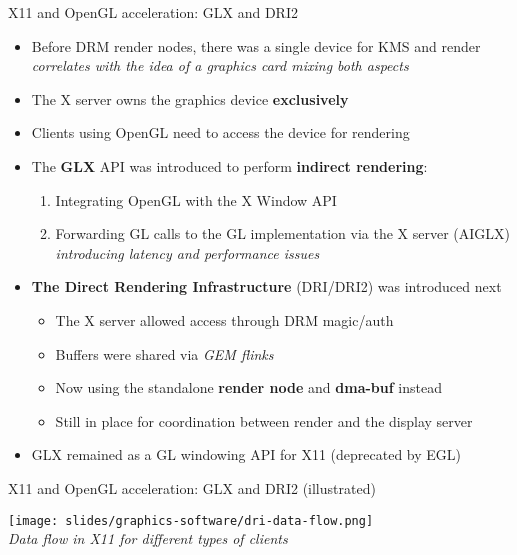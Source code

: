 \begin{frame}{X11 and OpenGL acceleration: GLX and DRI2}
  \begin{itemize}
  \item Before DRM render nodes, there was a single device for KMS and render\\
    \textit{correlates with the idea of a graphics card mixing both aspects}
  \item The X server owns the graphics device \textbf{exclusively}
  \item Clients using OpenGL need to access the device for rendering
  \item The \textbf{GLX} API was introduced to perform \textbf{indirect rendering}:
    \begin{enumerate}
    \item Integrating OpenGL with the X Window API
    \item Forwarding GL calls to the GL implementation via the X server (AIGLX)\\
      \textit{introducing latency and performance issues}
    \end{enumerate}
  \item \textbf{The Direct Rendering Infrastructure} (DRI/DRI2) was introduced next
    \begin{itemize}
    \item The X server allowed access through DRM magic/auth
    \item Buffers were shared via \textit{GEM flinks}
    \item Now using the standalone \textbf{render node} and \textbf{dma-buf} instead
    \item Still in place for coordination between render and the display server
    \end{itemize}
  \item GLX remained as a GL windowing API for X11 (deprecated by EGL)
  \end{itemize}
\end{frame}

\begin{frame}{X11 and OpenGL acceleration: GLX and DRI2 (illustrated)}
  \begin{center}
  \texttt{[image: slides/graphics-software/dri-data-flow.png]}\\
  \textit{Data flow in X11 for different types of clients}
  \end{center}
\end{frame}


